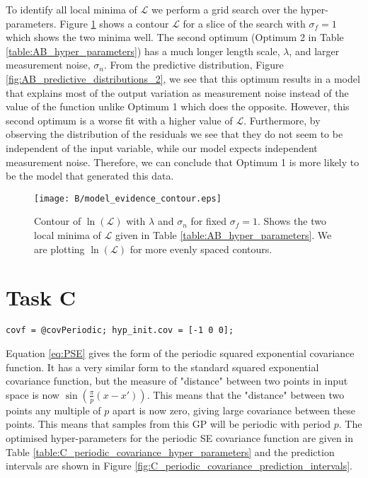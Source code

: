 \documentclass[11pt]{article}
\newcommand{\Lik}{\mathcal{L}}
\begin{document}
To identify all local minima of $\Lik$ we perform a grid search over the hyper-parameters. Figure \ref{fig:B_marginal_liklihood_contour} shows a contour $\Lik$ for a slice of the search with $\sigma_f=1$ which shows the two minima well. The second optimum (Optimum 2 in Table \ref{table:AB_hyper_parameters}) has a much longer length scale, $\lambda$, and larger measurement noise, $\sigma_n$. From the predictive distribution, Figure \ref{fig:AB_predictive_distributions_2}, we see that this optimum results in a model that explains most of the output variation as measurement noise instead of the value of the function unlike Optimum 1 which does the opposite. However, this second optimum is a worse fit with a higher value of $\Lik$. Furthermore, by observing the distribution of the residuals we see that they do not seem to be independent of the input variable, while our model expects independent measurement noise. Therefore, we can conclude that Optimum 1 is more likely to be the model that generated this data. 

\begin{figure}[h]
    \centering
    \texttt{[image: B/model\_evidence\_contour.eps]}
    \caption{Contour of $\ln(\Lik)$ with $\lambda$ and $\sigma_n$ for fixed $\sigma_f = 1$. Shows the two local minima of $\Lik$ given in Table \ref{table:AB_hyper_parameters}. We are plotting $\ln(\Lik)$ for more evenly spaced contours.}
    \label{fig:B_marginal_liklihood_contour}
\end{figure}

\section{Task C}

\begin{lstlisting}[caption=Code to use periodic SE covariance. Training and prediction code same as Listing \ref{lst:A}, label=lst:C, captionpos=b, basicstyle=\small, frame=tlrb]
covf = @covPeriodic; hyp_init.cov = [-1 0 0];
\end{lstlisting}

Equation \ref{eq:PSE} gives the form of the periodic squared exponential covariance function. It has a very similar form to the standard squared exponential covariance function, but the measure of "distance" between two points in input space is now $\sin(\frac{\pi}{p}(x-x'))$. This means that the "distance" between two points any multiple of $p$ apart is now zero, giving large covariance between these points. This means that samples from this GP will be periodic with period $p$. The optimised hyper-parameters for the periodic SE covariance function are given in Table \ref{table:C_periodic_covariance_hyper_parameters} and the prediction intervals are shown in Figure \ref{fig:C_periodic_covariance_prediction_intervals}.
\end{document}
